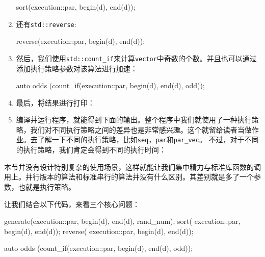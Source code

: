 \begin{enumerate}
\begin{codebox}[cpp]
    sort(execution::par, begin(d), end(d));
\end{codebox}

\item 还有\texttt{std::reverse}:

\begin{codebox}[cpp]
    reverse(execution::par, begin(d), end(d));
\end{codebox}

\item 然后，我们使用\texttt{std::count\_if}来计算\texttt{vector}中奇数的个数。并且也可以通过添加执行策略参数对该算法进行加速：

\begin{codebox}[cpp]
    auto odds (count_if(execution::par, begin(d), end(d), odd));
\end{codebox}

\item 最后，将结果进行打印：

\begin{codebox}[cpp]
    cout << (100.0 * odds / d.size())
        << "%
}
\end{codebox}

\item 编译并运行程序，就能得到下面的输出。整个程序中我们就使用了一种执行策略，我们对不同执行策略之间的差异也是非常感兴趣。这个就留给读者当做作业。去了解一下不同的执行策略，比如\texttt{seq}，\texttt{par}和\texttt{par\_vec}。 不过，对于不同的执行策略，我们肯定会得到不同的执行时间：


\end{enumerate}


本节并没有设计特别复杂的使用场景，这样就能让我们集中精力与标准库函数的调用上。并行版本的算法和标准串行的算法并没有什么区别。其差别就是多了一个参数，也就是执行策略。

让我们结合以下代码，来看三个核心问题：

\begin{codebox}[cpp]
generate(execution::par, begin(d), end(d), rand_num);
sort( execution::par, begin(d), end(d));
reverse( execution::par, begin(d), end(d));

auto odds (count_if(execution::par, begin(d), end(d), odd));
\end{codebox}

